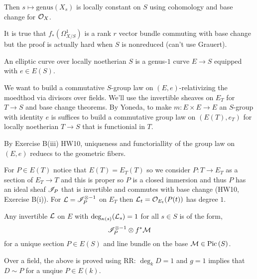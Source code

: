 \documentclass[12pt]{article}
\begin{document}
\begin{prop}
Then $s \mapsto \text{genus}(X_s)$ is locally constant on $S$ using cohomology and base change for $\mathcal{O}_{X}$. 
\end{prop}

\begin{rmk}
It is true that $f_* (\Omega^1_{X/S})$ is a rank $r$ vector bundle commuting with base change but the proof is actually hard when $S$ is nonreduced (can't use Grauert). 
\end{rmk}

\begin{defn}
An elliptic curve over locally noetherian $S$ is a genus-$1$ curve $E \to S$ equipped with $e \in E(S)$.
\end{defn}

We want to build a commutative $S$-group law on $(E, e)$-relativizing the moedthod via divisors over fields. We'll use the invertible sheaves on $E_T$ for $T \to S$ and base change theorems. By Yoneda, to make $m : E \times E \to E$ an $S$-group with identity $e$ is suffices to build a commutative group law on $(E(T), e_T)$ for locally noetherian $T \to S$ that is functionial in $T$. 

\begin{rmk}
By Exercise B(iii) HW10, uniqueness and functoriallity of the group law on $(E, e)$ reduecs to the geometric fibers. 
\end{rmk}

For $P \in E(T)$ notice that $E(T) = E_T(T)$ so we consider $P : T \to E_T$ as a section of $E_T \to T$ and this is proper so $P$ is a closed immersion and thus $P$ has an ideal sheaf $\mathscr{I}_P$ that is invertible and commutes with base change (HW10, Exercise B(i)). For $\mathcal{L} = \mathscr{I}_P^{\otimes - 1}$ on $E_T$ then $\mathcal{L}_t = \mathcal{O}_{E_t}(P(t))$ has degree $1$. 

\begin{thm}
Any invertible $\mathcal{L}$ on $E$ with $\deg_{\kappa(s)}(\mathcal{L}_s) = 1$ for all $s \in S$ is of the form,
\[ \mathscr{I}_P^{\otimes - 1} \otimes f^* \mathcal{M} \]
for a unique section $P \in E(S)$ and line bundle on the base $\mathcal{M} \in \mathrm{Pic} \left( S \right)$. 
\end{thm}

\begin{rmk}
Over a field, the above is proved using RR: $\deg_k D = 1$ and $g = 1$ implies that $D \sim P$ for a unqiue $P \in E(k)$. 
\end{rmk}
\end{document}
